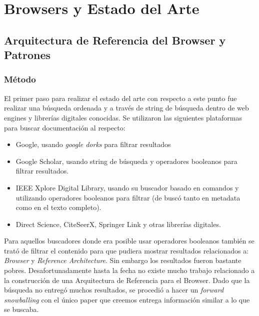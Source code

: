 \chapter{Browsers y Estado del Arte}
\label{chap4:EA}

\section{Arquitectura de Referencia del Browser y Patrones}
\label{chap3:ArqRefBrowandPatt}


\subsection{Método}
El primer paso para realizar el estado del arte con respecto a este punto fue realizar una búsqueda ordenada y a través de string de búsqueda dentro de web engines y librerías digitales conocidas. Se utilizaron las siguientes plataformas para buscar documentación al respecto:
\begin{itemize}
    \item Google, usando \textit{google dorks} para filtrar resultados
    \item Google Scholar, usando string de búsqueda y operadores booleanos para filtrar resultados.
    \item IEEE Xplore Digital Library, usando su buscador basado en comandos y utilizando operadores booleanos para filtrar (de buscó tanto en metadata como en el texto completo).
    \item Direct Science, CiteSeerX, Springer Link y otras librerías digitales. 
\end{itemize}

Para aquellos buscadores donde era posible usar operadores booleanos también se trató de filtrar el contenido para que pudiera mostrar resultados relacionados a: \textit{Browser} y \textit{Reference Architecture}. Sin embargo los resultados fueron bastante pobres. Desafortunadamente hasta la fecha no existe mucho trabajo relacionado a la construcción de una Arquitectura de Referencia para el Browser. Dado que la búsqueda no entregó muchos resultados, se procedió a hacer un \textit{forward snowballing} con el único paper que creemos entrega información similar a lo que se buscaba.

